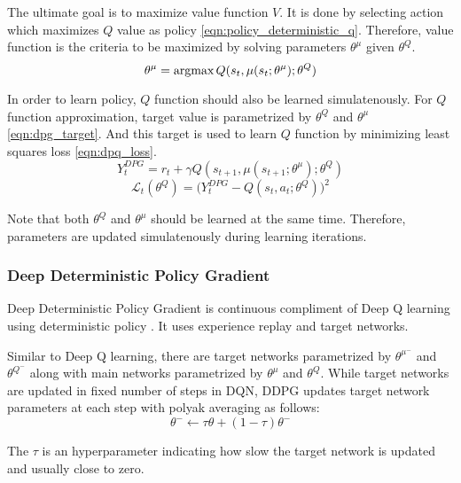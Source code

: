 The ultimate goal is to maximize value function $V$. It is done by selecting action which maximizes $Q$ value as policy \eqref{eqn:policy_deterministic_q}. Therefore, value function is the criteria to be maximized by solving parameters $\theta^\mu$ given $\theta^Q$. 
%
\begin{equation}
\label{eqn:dpg_value_maximization}
\theta^\mu = \operatorname{\textup{argmax}} Q(s_t, \mu(s_t;\theta^\mu);\theta^Q)
\end{equation}

In order to learn policy, $Q$ function should also be learned simulatenously. For $Q$ function approximation, target value is parametrized by $\theta^Q$ and $\theta^\mu$ \eqref{eqn:dpg_target}. And this target is used to learn $Q$ function by minimizing least squares loss \eqref{eqn:dpq_loss}.
%
\begin{equation}
\label{eqn:dpg_target}
Y_t^{DPG} = r_t + \gamma Q(s_{t+1}, \mu(s_{t+1};\theta^\mu);\theta^Q)
\end{equation}
%
\begin{equation}
\label{eqn:dpq_loss}
\mathcal{L}_t(\theta^Q) = \big( Y_t^{DPG} - Q(s_t,a_t;\theta^Q) \big) ^ 2
\end{equation}

Note that both $\theta^Q$ and $\theta^\mu$ should be learned at the same time. Therefore, parameters are updated simulatenously during learning iterations.

\subsubsection{Deep Deterministic Policy Gradient}
Deep Deterministic Policy Gradient is continuous compliment of Deep Q learning using deterministic policy \cite{lillicrap_continuous_2019}. It uses experience replay and target networks.  

Similar to Deep Q learning, there are target networks parametrized by $\theta^{\mu^-}$ and $\theta^{Q^-}$ along with main networks parametrized by $\theta^{\mu}$ and $\theta^{Q}$. While target networks are updated in fixed number of steps in DQN, DDPG updates target network parameters at each step with polyak averaging as follows:
%
\begin{equation}
\label{eqn:target_update}
\theta^- \leftarrow \tau \theta + (1-\tau) \theta^-
\end{equation}

The $\tau$ is an hyperparameter indicating how slow the target network is updated and usually close to zero.

